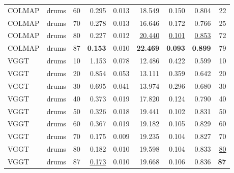 \begin{table}[H]
\begin{tabular}{llrrrrrrr}
COLMAP & drums & 60 & 0.295 & 0.013 & 18.549 & 0.150 & 0.804 & 22 \\
COLMAP & drums & 70 & 0.278 & 0.013 & 16.646 & 0.172 & 0.766 & 25 \\
COLMAP & drums & 80 & 0.227 & 0.012 & \underline{20.440} & \underline{0.101} & \underline{0.853} & 72 \\
COLMAP & drums & 87 & \textbf{0.153} & 0.010 & \textbf{22.469} & \textbf{0.093} & \textbf{0.899} & 79 \\
VGGT & drums & 10 & 1.153 & 0.078 & 12.486 & 0.422 & 0.599 & 10 \\
VGGT & drums & 20 & 0.854 & 0.053 & 13.111 & 0.359 & 0.642 & 20 \\
VGGT & drums & 30 & 0.695 & 0.041 & 13.974 & 0.296 & 0.680 & 30 \\
VGGT & drums & 40 & 0.373 & 0.019 & 17.820 & 0.124 & 0.790 & 40 \\
VGGT & drums & 50 & 0.326 & 0.018 & 19.441 & 0.102 & 0.831 & 50 \\
VGGT & drums & 60 & 0.367 & 0.019 & 19.182 & 0.105 & 0.829 & 60 \\
VGGT & drums & 70 & 0.175 & 0.009 & 19.235 & 0.104 & 0.827 & 70 \\
VGGT & drums & 80 & 0.182 & 0.010 & 19.598 & 0.104 & 0.833 & \underline{80} \\
VGGT & drums & 87 & \underline{0.173} & 0.010 & 19.668 & 0.106 & 0.836 & \textbf{87} \\
\bottomrule
\end{tabular}
\end{table}